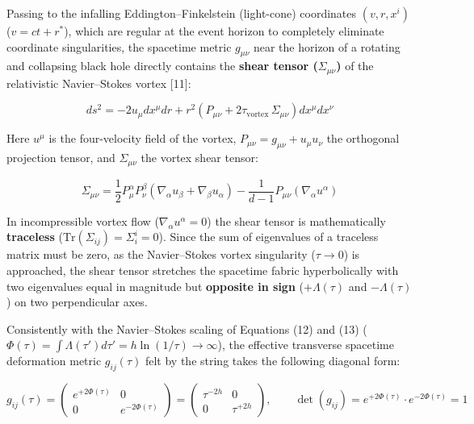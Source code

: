 \documentclass[12pt,a4paper]{article}
\begin{document}
Passing to the infalling Eddington--Finkelstein (light-cone) coordinates $(v, r, x^i)$ ($v = ct + r^*$), which are regular at the event horizon to completely eliminate coordinate singularities, the spacetime metric $g_{\mu\nu}$ near the horizon of a rotating and collapsing black hole directly contains the \textbf{shear tensor ($\Sigma_{\mu\nu}$)} of the relativistic Navier--Stokes vortex [11]:

\begin{equation}
ds^2 = -2 u_\mu dx^\mu dr + r^2 \left( P_{\mu\nu} + 2 \tau_{\text{vortex}} \, \Sigma_{\mu\nu} \right) dx^\mu dx^\nu
\end{equation}

Here $u^\mu$ is the four-velocity field of the vortex, $P_{\mu\nu} = g_{\mu\nu} + u_\mu u_\nu$ the orthogonal projection tensor, and $\Sigma_{\mu\nu}$ the vortex shear tensor:

\begin{equation}
\Sigma_{\mu\nu} = \frac{1}{2} P_\mu^\alpha P_\nu^\beta \left( \nabla_\alpha u_\beta + \nabla_\beta u_\alpha \right) - \frac{1}{d-1} P_{\mu\nu} (\nabla_\alpha u^\alpha)
\end{equation}

In incompressible vortex flow ($\nabla_\alpha u^\alpha = 0$) the shear tensor is mathematically \textbf{traceless} ($\text{Tr}(\Sigma_{ij}) = \Sigma^i_i = 0$). Since the sum of eigenvalues of a traceless matrix must be zero, as the Navier--Stokes vortex singularity ($\tau \to 0$) is approached, the shear tensor stretches the spacetime fabric hyperbolically with two eigenvalues equal in magnitude but \textbf{opposite in sign} ($+\Lambda(\tau)$ and $-\Lambda(\tau)$) on two perpendicular axes.

Consistently with the Navier--Stokes scaling of Equations (12) and (13) ($\Phi(\tau) = \int \Lambda(\tau') d\tau' = h \ln(1/\tau) \to \infty$), the effective transverse spacetime deformation metric $g_{ij}(\tau)$ felt by the string takes the following diagonal form:

\begin{equation}
g_{ij}(\tau) = \begin{pmatrix} e^{+2\Phi(\tau)} & 0 \\ 0 & e^{-2\Phi(\tau)} \end{pmatrix} = \begin{pmatrix} \tau^{-2h} & 0 \\ 0 & \tau^{+2h} \end{pmatrix}, \qquad \det(g_{ij}) = e^{+2\Phi(\tau)} \cdot e^{-2\Phi(\tau)} = 1
\end{equation}
\end{document}
